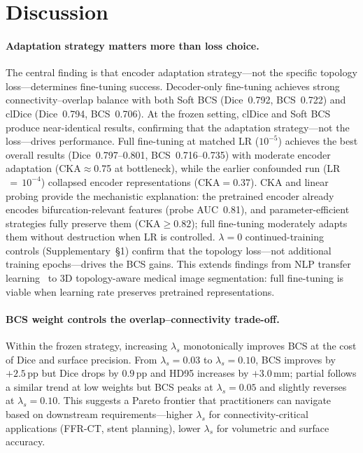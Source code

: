 \documentclass[runningheads]{llncs}
\begin{document}
\section{Discussion}

\paragraph{Adaptation strategy matters more than loss choice.}
The central finding is that encoder adaptation strategy---not the specific topology loss---determines fine-tuning success.
Decoder-only fine-tuning achieves strong connectivity--overlap balance with both Soft BCS (Dice~0.792, BCS~0.722) and clDice (Dice~0.794, BCS~0.706).
At the frozen setting, clDice and Soft BCS produce near-identical results, confirming that the adaptation strategy---not the loss---drives performance.
Full fine-tuning at matched LR ($10^{-5}$) achieves the best overall results (Dice~0.797--0.801, BCS~0.716--0.735) with moderate encoder adaptation (CKA${\approx}$0.75 at bottleneck), while the earlier confounded run (LR$\,{=}\,10^{-4}$) collapsed encoder representations (CKA${=}$0.37).
CKA and linear probing provide the mechanistic explanation: the pretrained encoder already encodes bifurcation-relevant features (probe AUC~0.81), and parameter-efficient strategies fully preserve them (CKA${\geq}0.82$); full fine-tuning moderately adapts them without destruction when LR is controlled.
$\lambda{=}0$ continued-training controls (Supplementary~\S1) confirm that the topology loss---not additional training epochs---drives the BCS gains.
This extends findings from NLP transfer learning~\cite{kumar_finetuning_2022} to 3D topology-aware medical image segmentation: full fine-tuning is viable when learning rate preserves pretrained representations.

\paragraph{BCS weight controls the overlap--connectivity trade-off.}
Within the frozen strategy, increasing $\lambda_s$ monotonically improves BCS at the cost of Dice and surface precision.
From $\lambda_s{=}0.03$ to $\lambda_s{=}0.10$, BCS improves by $+2.5$\,pp but Dice drops by $0.9$\,pp and HD95 increases by $+3.0$\,mm; partial follows a similar trend at low weights but BCS peaks at $\lambda_s{=}0.05$ and slightly reverses at $\lambda_s{=}0.10$.
This suggests a Pareto frontier that practitioners can navigate based on downstream requirements---higher $\lambda_s$ for connectivity-critical applications (FFR-CT, stent planning), lower $\lambda_s$ for volumetric and surface accuracy.
\end{document}
